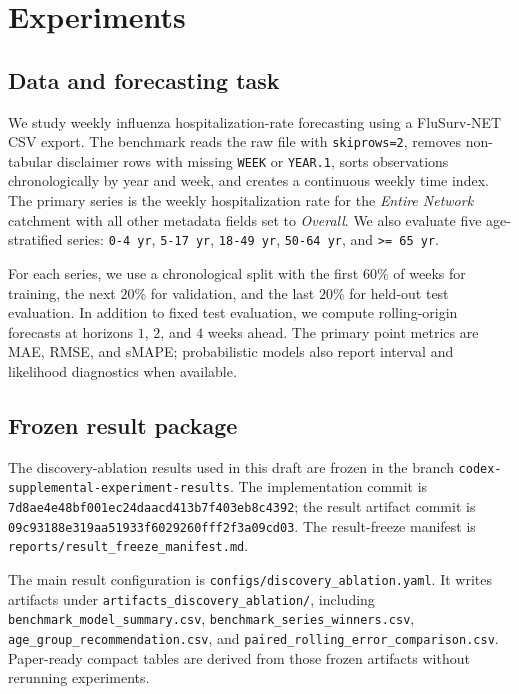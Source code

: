 \section{Experiments}

\subsection{Data and forecasting task}

We study weekly influenza hospitalization-rate forecasting using a
FluSurv-NET CSV export. The benchmark reads the raw file with
\texttt{skiprows=2}, removes non-tabular disclaimer rows with missing
\texttt{WEEK} or \texttt{YEAR.1}, sorts observations chronologically by year
and week, and creates a continuous weekly time index. The primary series is
the weekly hospitalization rate for the \emph{Entire Network} catchment with
all other metadata fields set to \emph{Overall}. We also evaluate five
age-stratified series: \texttt{0-4 yr}, \texttt{5-17 yr},
\texttt{18-49 yr}, \texttt{50-64 yr}, and \texttt{>= 65 yr}.

For each series, we use a chronological split with the first $60\%$ of weeks
for training, the next $20\%$ for validation, and the last $20\%$ for held-out
test evaluation. In addition to fixed test evaluation, we compute
rolling-origin forecasts at horizons $1$, $2$, and $4$ weeks ahead. The primary
point metrics are MAE, RMSE, and sMAPE; probabilistic models also report
interval and likelihood diagnostics when available.

\subsection{Frozen result package}

The discovery-ablation results used in this draft are frozen in the branch
\texttt{codex-supplemental-experiment-results}. The implementation commit is
\texttt{7d8ae4e48bf001ec24daacd413b7f403eb8c4392}; the result artifact commit
is \texttt{09c93188e319aa51933f6029260fff2f3a09cd03}. The result-freeze
manifest is \texttt{reports/result\_freeze\_manifest.md}.

The main result configuration is
\texttt{configs/discovery\_ablation.yaml}. It writes artifacts under
\texttt{artifacts\_discovery\_ablation/}, including
\texttt{benchmark\_model\_summary.csv},
\texttt{benchmark\_series\_winners.csv},
\texttt{age\_group\_recommendation.csv}, and
\texttt{paired\_rolling\_error\_comparison.csv}. Paper-ready compact tables
are derived from those frozen artifacts without rerunning experiments.

